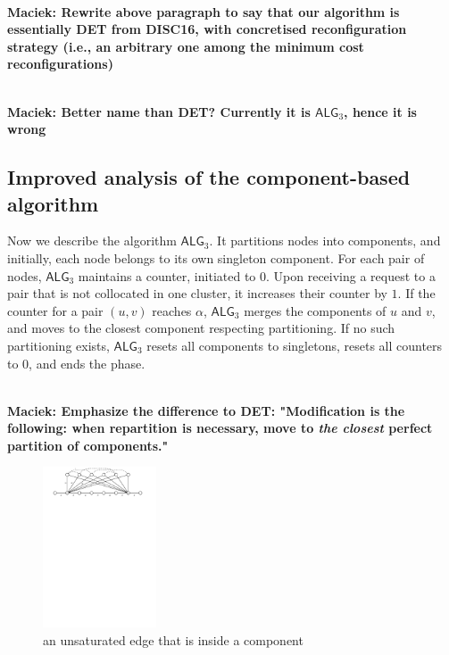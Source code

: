 \documentclass[manuscript,screen=true, review, anonymous]{acmart}
\newcommand{\TAlg}{{\ensuremath{\textsf{ALG}_{3}}}\xspace}
\newcommand\maciek[1]{\color{brown}\textbf{\\ Maciek: #1}\color{black}}
\begin{document}
\maciek{Rewrite above paragraph to say that our algorithm is essentially DET from DISC16, with concretised reconfiguration strategy (i.e., an arbitrary one among the minimum cost reconfigurations)}

\maciek{Better name than DET? Currently it is \TAlg, hence it is wrong}

\subsection{Improved analysis of the component-based algorithm}
\label{sec:k3}


Now we describe the algorithm \TAlg.
It partitions nodes into components, and
initially, each node belongs to its own singleton component.
For each pair of nodes, \TAlg maintains a counter, initiated to $0$. 
Upon receiving a request to a pair that is not collocated in one cluster, it increases their counter by $1$.
If the counter for a pair $(u,v)$ reaches $\alpha$, \TAlg merges the components of $u$ and $v$, and moves to the closest component respecting partitioning.
If no such partitioning exists, \TAlg resets all components to singletons, resets all counters to $0$, and ends the phase.

\maciek{Emphasize the difference to DET: "Modification is the following: when repartition is necessary, move to \emph{the closest} perfect partition of components."}




\begin{figure}[H]
	\centering
	\includegraphics[width=0.3\textwidth]{figs/substitute}
	\caption{an unsaturated edge that is inside a component}
\end{figure}
\end{document}
